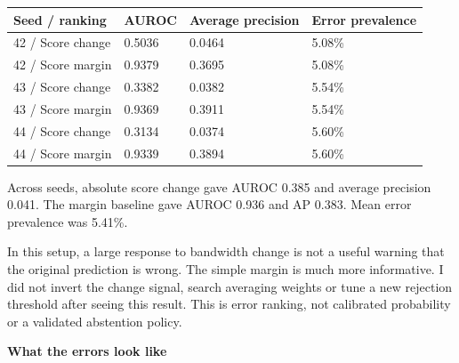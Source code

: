 \documentclass[10pt,a4paper]{article}
\newcommand{\reporttitle}[1]{{\color{navy}\Large\bfseries #1}\par\vspace{5pt}}
\begin{document}
\begin{center}\small

\begin{tabular}{@{}llll@{}}\toprule

Seed / ranking & AUROC & Average precision & Error prevalence \\

\midrule

42 / Score change & 0.5036 & 0.0464 & 5.08\% \\

42 / Score margin & 0.9379 & 0.3695 & 5.08\% \\

43 / Score change & 0.3382 & 0.0382 & 5.54\% \\

43 / Score margin & 0.9369 & 0.3911 & 5.54\% \\

44 / Score change & 0.3134 & 0.0374 & 5.60\% \\

44 / Score margin & 0.9339 & 0.3894 & 5.60\% \\

\bottomrule\end{tabular}\end{center}

Across seeds, absolute score change gave AUROC 0.385 and average precision 0.041. The margin baseline gave AUROC 0.936 and AP 0.383. Mean error prevalence was 5.41\%.\par

In this setup, a large response to bandwidth change is not a useful warning that the original prediction is wrong. The simple margin is much more informative. I did not invert the change signal, search averaging weights or tune a new rejection threshold after seeing this result. This is error ranking, not calibrated probability or a validated abstention policy.\par

\clearpage

\reporttitle{What the errors look like}
\end{document}
